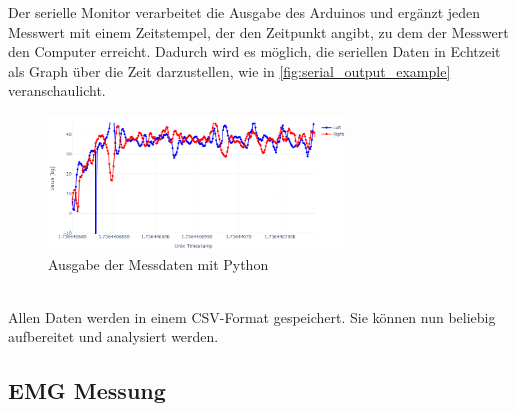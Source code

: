 Der serielle Monitor verarbeitet die Ausgabe des Arduinos und ergänzt jeden Messwert mit einem Zeitstempel, der den Zeitpunkt angibt, zu dem der Messwert den Computer erreicht.
Dadurch wird es möglich, die seriellen Daten in Echtzeit als Graph über die Zeit darzustellen, wie in \autoref{fig:serial_output_example} veranschaulicht.
\begin{figure}[h!]
    \centering
    \includegraphics[width=0.7\textwidth]{img/serial_output_example.png} %
    \caption{Ausgabe der Messdaten mit Python}
    \label{fig:serial_output_example}
\end{figure}
\\
Allen Daten werden in einem CSV-Format gespeichert.
Sie können nun beliebig aufbereitet und analysiert werden.


\subsection{EMG Messung}

